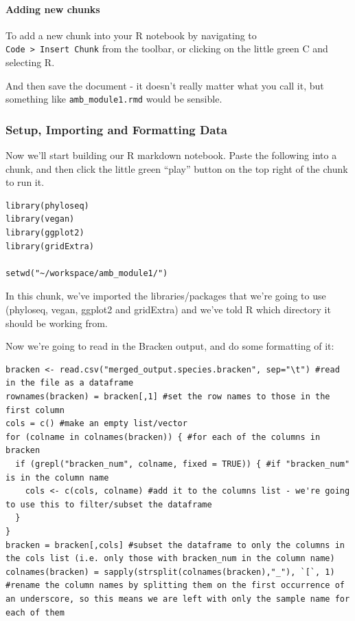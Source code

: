 \documentclass[
]{book}
\begin{document}
\paragraph{Adding new chunks}\label{adding-new-chunks}

To add a new chunk into your R notebook by navigating to \texttt{Code\ \textgreater{}\ Insert\ Chunk} from the toolbar, or clicking on the little green C and selecting R.

And then save the document - it doesn't really matter what you call it, but something like \texttt{amb\_module1.rmd} would be sensible.

\subsubsection{Setup, Importing and Formatting Data}\label{setup-importing-and-formatting-data}

Now we'll start building our R markdown notebook. Paste the following into a chunk, and then click the little green ``play'' button on the top right of the chunk to run it.

\begin{verbatim}
library(phyloseq)
library(vegan)
library(ggplot2)
library(gridExtra)

setwd("~/workspace/amb_module1/")
\end{verbatim}

In this chunk, we've imported the libraries/packages that we're going to use (phyloseq, vegan, ggplot2 and gridExtra) and we've told R which directory it should be working from.

Now we're going to read in the Bracken output, and do some formatting of it:

\begin{verbatim}
bracken <- read.csv("merged_output.species.bracken", sep="\t") #read in the file as a dataframe
rownames(bracken) = bracken[,1] #set the row names to those in the first column
cols = c() #make an empty list/vector
for (colname in colnames(bracken)) { #for each of the columns in bracken
  if (grepl("bracken_num", colname, fixed = TRUE)) { #if "bracken_num" is in the column name
    cols <- c(cols, colname) #add it to the columns list - we're going to use this to filter/subset the dataframe
  }
}
bracken = bracken[,cols] #subset the dataframe to only the columns in the cols list (i.e. only those with bracken_num in the column name)
colnames(bracken) = sapply(strsplit(colnames(bracken),"_"), `[`, 1) #rename the column names by splitting them on the first occurrence of an underscore, so this means we are left with only the sample name for each of them
\end{verbatim}
\end{document}
